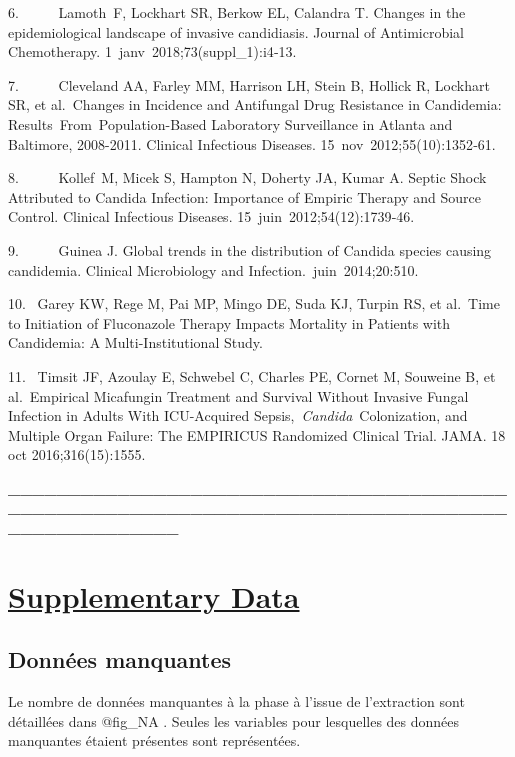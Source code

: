 \documentclass[
  french,
  letterpaper,
  DIV=11,
  numbers=noendperiod,
  justified]{scrartcl}
\begin{document}
6.~~~~~ Lamoth~F, Lockhart SR, Berkow EL, Calandra T. Changes in the
epidemiological landscape of invasive candidiasis. Journal of
Antimicrobial Chemotherapy. 1~janv~2018;73(suppl\_1):i4‑13.~

7.~~~~~ Cleveland AA, Farley MM, Harrison LH, Stein B, Hollick R,
Lockhart SR, et al.~Changes in Incidence and Antifungal Drug Resistance
in Candidemia: Results~From~Population-Based Laboratory Surveillance in
Atlanta and Baltimore, 2008-2011. Clinical Infectious Diseases.
15~nov~2012;55(10):1352‑61.~

8.~~~~~ Kollef~M, Micek S, Hampton N, Doherty JA, Kumar A. Septic Shock
Attributed to Candida Infection: Importance of Empiric Therapy and
Source Control. Clinical Infectious Diseases.
15~juin~2012;54(12):1739‑46.~

9.~~~~~ Guinea J. Global trends in the distribution of Candida species
causing candidemia. Clinical Microbiology and
Infection.~juin~2014;20:510.~

10.~ Garey KW, Rege M, Pai MP, Mingo DE, Suda KJ, Turpin RS, et al.~Time
to Initiation of Fluconazole Therapy Impacts Mortality in Patients with
Candidemia: A Multi-Institutional Study.~

11.~ Timsit JF, Azoulay E, Schwebel C, Charles PE, Cornet M, Souweine B,
et al.~Empirical Micafungin Treatment and Survival Without Invasive
Fungal Infection in Adults With ICU-Acquired
Sepsis,~\emph{Candida}~Colonization, and Multiple Organ Failure: The
EMPIRICUS Randomized Clinical Trial. JAMA. 18 oct 2016;316(15):1555.

\textbf{\_\_\_\_\_\_\_\_\_\_\_\_\_\_\_\_\_\_\_\_\_\_\_\_\_\_\_\_\_\_\_\_\_\_\_\_\_\_\_\_\_\_\_\_\_\_\_\_\_\_\_\_\_\_\_\_\_\_\_\_\_\_\_\_\_\_\_\_\_\_\_\_\_\_\_\_\_\_\_\_\_\_\_\_\_\_\_\_\_\_\_\_\_\_\_\_}

\section{\texorpdfstring{\ul{Supplementary
Data}}{Supplementary Data}}\label{supplementary-data}

\subsection{Données manquantes}\label{donnuxe9es-manquantes}

Le nombre de données manquantes à la phase à l'issue de l'extraction
sont détaillées dans @fig\_NA . Seules les variables pour lesquelles des
données manquantes étaient présentes sont représentées.
\end{document}
